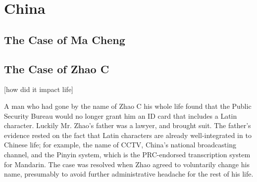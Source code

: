 \section{China}

\subsection{The Case of Ma Cheng}

\subsection{The Case of Zhao C}

[how did it impact life]

A man who had gone by the name of Zhao C his whole life found that the Public
Security Bureau would no longer grant him an ID card that includes a Latin
character. Luckily Mr. Zhao's father was a lawyer, and brought suit. The
father's evidence rested on the fact that Latin characters are already
well-integrated in to Chinese life; for example, the name of CCTV, China's
national broadcasting channel, and the Pinyin system, which is the PRC-endorsed
transcription system for Mandarin. The case was resolved when Zhao agreed to
voluntarily change his name, presumably to avoid further administrative headache
for the rest of his life.


